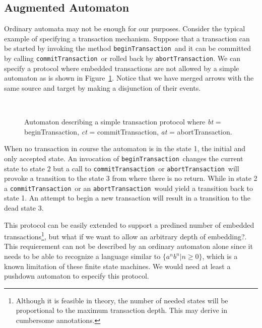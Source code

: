 \documentclass[a4paper,10pt]{article}
\def\node#1{*++[o][F-]{#1}}  %
\def\anode#1{*++[o][F=]{#1}}  %
\def\bt{\texttt{beginTransaction}}
\def\ct{\texttt{commitTransaction}}
\def\at{\texttt{abortTransaction}}
\begin{document}
\subsection{Augmented Automaton}
Ordinary automata may not be enough for our purposes. Consider the typical
example of specifying a transaction mechanism. Suppose that a transaction can
be started by invoking the method \bt\ and it can be committed by calling \ct\
or rolled back by \at.
We can specify a protocol where embedded transactions are not allowed by a
simple automaton as is shown in Figure~\ref{fig:STP}. Notice that we have merged
arrows with the same source and target by making a disjunction of their events.

\begin{figure}[htb] %
\centering\ 
\xymatrix{
  *\txt{} \ar[r]
  & \anode{1} \ar[rr]_{bt} \ar[dr]_{ct\: \vee\: at}
  && \node{2} \ar@/_1pc/[ll]_{ct\: \vee\: at} \ar[dl]^{bt}\\
  && \node{3} \ar@(dl,dr)[]_{bt\: \vee\: ct\: \vee\: at}
}
\caption{Automaton describing a simple transaction protocol where
\textit{bt} = beginTransaction, \textit{ct} = commitTransaction,
\textit{at} = abortTransaction.}\label{fig:STP}
\end{figure}

When no transaction in course the automaton is in the state 1, the initial and
only accepted state. An invocation of \bt\ changes the current state to state 2
but a call to \ct\ or \at\ will provoke a transition to the state 3 from where
there is no return. While in state 2 a \ct\ or an \at\ would yield a transition
back to state 1. An attempt to begin a new transaction will result in a
transition to the dead state 3.

This protocol can be easily extended to support a predined number of embedded
transactions\footnote{Although it is feasible in theory, the number of needed
states will be proportional to the maximum transaction depth. This may
derive in cumbersome annotations.}, but what if we want to allow an arbitrary
depth of embedding?.
This requierement can not be described by an ordinary automaton alone since it
needs to be able to recognize a language similar to $\{a^nb^n | n \geq 0\}$,
which is a known limitation of these finite state machines. We would need at
least a pushdown automaton to especify this protocol.
\end{document}
